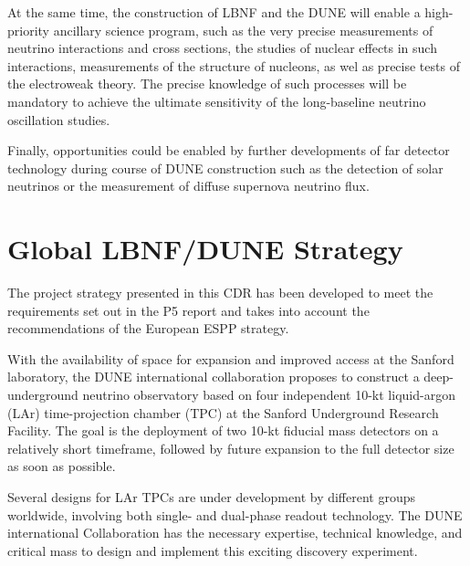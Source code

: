 At the same time, the construction of LBNF and the DUNE will enable a high-priority ancillary science program, such as 
the very precise measurements of neutrino interactions and cross sections, the studies of nuclear effects in such interactions, measurements of the structure of nucleons, as wel as precise tests of the electroweak theory. The precise knowledge of such processes will be mandatory to achieve the ultimate sensitivity of the long-baseline neutrino oscillation studies.

Finally, opportunities could be enabled by further developments of far detector technology during course of DUNE construction such as the detection of
solar neutrinos or the measurement of diffuse supernova neutrino flux.


\section{Global LBNF/DUNE Strategy}

The project strategy presented in this CDR has been developed to meet the requirements 
set out in the P5 report and %
takes into account the recommendations of the European 
ESPP strategy.

With the availability of space for expansion and improved access at the Sanford laboratory, 
the DUNE international collaboration proposes to construct a deep-underground neutrino observatory based on four independent 10-kt liquid-argon (LAr) time-projection chamber (TPC) at the Sanford Underground Research Facility.  
The goal is the deployment of two 10-kt fiducial mass detectors on a relatively short timeframe, followed by future expansion to the full detector size as soon as possible. 

Several designs for LAr TPCs are under development by different groups worldwide, involving both single- and dual-phase readout technology.
The DUNE international Collaboration has the necessary expertise, technical knowledge, and critical mass to design and implement this exciting discovery experiment. 

